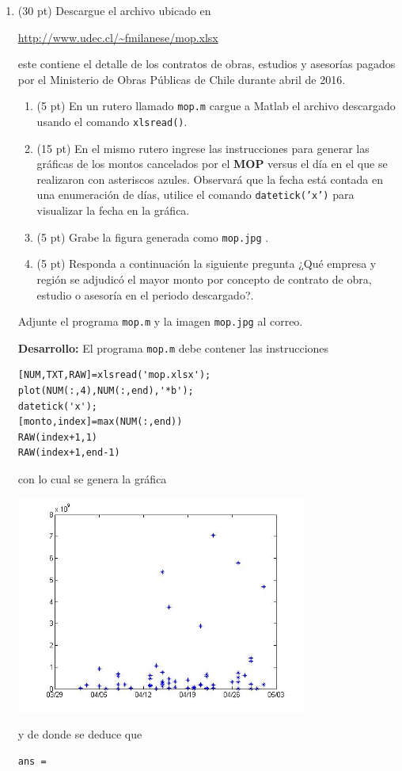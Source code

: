 \documentclass[11pt]{article}
\begin{document}
\begin{enumerate}
\item (30 pt) Descargue el archivo ubicado en 
\begin{center}
\url{http://www.udec.cl/~fmilanese/mop.xlsx}
\end{center}
este contiene el detalle de los contratos de obras, estudios y asesorías pagados por el Ministerio de Obras Públicas de Chile durante abril de 2016.
\begin{enumerate}
	\item (5 pt) En un rutero llamado \texttt{mop.m} cargue a Matlab el archivo descargado usando el comando \texttt{xlsread()}.
    \item (15 pt) En el mismo rutero ingrese las instrucciones para generar las gr\'aficas de los montos cancelados por el \textbf{MOP} versus el día en el que se realizaron con asteriscos azules. Observará que la fecha está contada en una enumeración de días, utilice el comando \texttt{datetick('x')} para visualizar la fecha en la gráfica. 
    \item (5 pt) Grabe la figura generada como \texttt{mop.jpg} .
    \item (5 pt) Responda a continuaci\'on la siguiente pregunta ¿Qu\'e empresa y regi\'on se adjudicó el mayor monto por concepto de contrato de obra, estudio o asesoría en el periodo descargado?.

    
\end{enumerate}
Adjunte el programa \texttt{mop.m} y la imagen \texttt{mop.jpg} al correo.

\textbf{Desarrollo:} El programa \texttt{mop.m} debe contener las instrucciones
\begin{lstlisting}
[NUM,TXT,RAW]=xlsread('mop.xlsx');
plot(NUM(:,4),NUM(:,end),'*b');
datetick('x');
[monto,index]=max(NUM(:,end))
RAW(index+1,1)
RAW(index+1,end-1)
\end{lstlisting}
con lo cual se genera la gr\'afica
\begin{center}
\includegraphics[width=0.75\textwidth]{./mop.jpg}
\end{center}
y de donde se deduce que
\begin{lstlisting}
ans = 


\end{lstlisting}
\end{enumerate}
\end{document}
